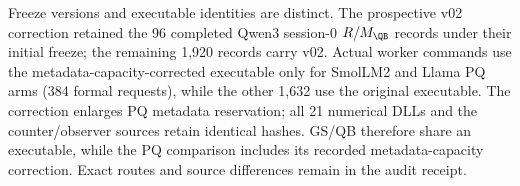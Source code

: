 Freeze versions and executable identities are distinct. The prospective v02 correction retained the 96 completed Qwen3 session-0 $R/M_{\QB}$ records under their initial freeze; the remaining 1,920 records carry v02. Actual worker commands use the metadata-capacity-corrected executable only for SmolLM2 and Llama PQ arms (384 formal requests), while the other 1,632 use the original executable. The correction enlarges PQ metadata reservation; all 21 numerical DLLs and the counter/observer sources retain identical hashes. GS/QB therefore share an executable, while the PQ comparison includes its recorded metadata-capacity correction. Exact routes and source differences remain in the audit receipt.
